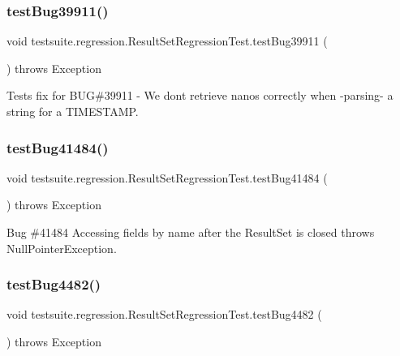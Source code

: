 \subsubsection{\texorpdfstring{test\+Bug39911()}{testBug39911()}}
{\footnotesize\ttfamily void testsuite.\+regression.\+Result\+Set\+Regression\+Test.\+test\+Bug39911 (\begin{DoxyParamCaption}{ }\end{DoxyParamCaption}) throws Exception}

Tests fix for B\+UG\#39911 -\/ We don\textquotesingle{}t retrieve nanos correctly when -\/parsing-\/ a string for a T\+I\+M\+E\+S\+T\+A\+MP. \mbox{\label{classtestsuite_1_1regression_1_1_result_set_regression_test_a80a9d333e89511f5233ebc8c8d2fd4b6}} 
\subsubsection{\texorpdfstring{test\+Bug41484()}{testBug41484()}}
{\footnotesize\ttfamily void testsuite.\+regression.\+Result\+Set\+Regression\+Test.\+test\+Bug41484 (\begin{DoxyParamCaption}{ }\end{DoxyParamCaption}) throws Exception}

Bug \#41484 Accessing fields by name after the Result\+Set is closed throws Null\+Pointer\+Exception. \mbox{\label{classtestsuite_1_1regression_1_1_result_set_regression_test_adb7d4f5375bd8e7ac8f4cc267e818fea}} 
\subsubsection{\texorpdfstring{test\+Bug4482()}{testBug4482()}}
{\footnotesize\ttfamily void testsuite.\+regression.\+Result\+Set\+Regression\+Test.\+test\+Bug4482 (\begin{DoxyParamCaption}{ }\end{DoxyParamCaption}) throws Exception}

